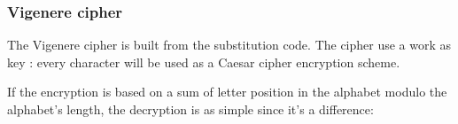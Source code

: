 \subsubsection{ Vigenere cipher }

The  Vigenere cipher is built from the substitution code. The cipher use a work as key : every character will be used as a Caesar cipher encryption scheme. 

\begin{table}[h!]
    \centering
	\caption{Exemple of a encryption using the vigenere code}
	\label{tab:ExempleVigenereEncryption}
\end{table}

If the encryption is based on a sum of letter position in the alphabet modulo the alphabet's length, the decryption is as simple since it's a difference: 

\begin{table}[h!]
    \centering
	\caption{Exemple of a decryption using the vigenere code}
	\label{tab:ExempleVigenereDecryption}
\end{table}



